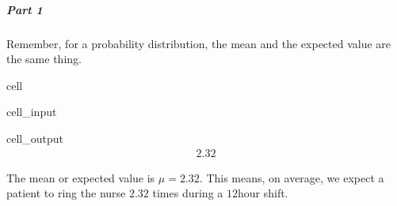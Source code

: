 \documentclass[letterpaper,10pt,english]{jupyterBook}
\begin{document}
\subparagraph{Part 1}
\label{\detokenize{Ch3 Probability/3.5 Discrete Probability Distributions:id9}}
\sphinxAtStartPar
Remember, for a probability distribution, the mean and the expected value are the same thing.

\begin{sphinxuseclass}{cell}\begin{sphinxVerbatimInput}

\begin{sphinxuseclass}{cell_input}
\begin{sphinxVerbatim}[commandchars=\\\{\}]

\end{sphinxVerbatim}

\end{sphinxuseclass}\end{sphinxVerbatimInput}
\begin{sphinxVerbatimOutput}

\begin{sphinxuseclass}{cell_output}\begin{equation*}
\begin{split}2.32\end{split}
\end{equation*}
\end{sphinxuseclass}\end{sphinxVerbatimOutput}

\end{sphinxuseclass}
\sphinxAtStartPar
The mean or expected value is \(\mu = 2.32\). This means, on average, we expect a patient to ring the nurse \(2.32\) times during a \(12\)\sphinxhyphen{}hour shift.
\end{document}
